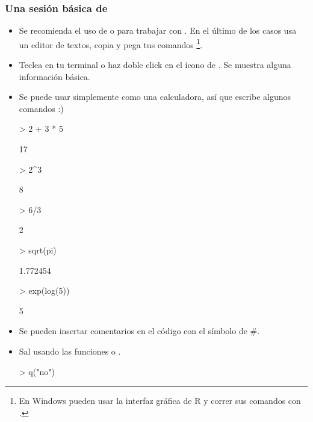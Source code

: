 \begin{frame}
  \frametitle{Una sesi\'on b\'asica de }
  \begin{itemize}
  \item Se recomienda el uso de   o  para trabajar con . En el \'ultimo de los casos usa un editor de textos, copia y pega tus comandos \footnote{En Windows pueden usar la interfaz gr\'afica de R y correr sus comandos con .}.
  \item Teclea  en tu terminal o haz doble click en el \'icono de . Se muestra alguna informaci\'on b\'asica.
  \item Se puede usar  simplemente como una calculadora, as\'i que escribe algunos comandos :)  
\begin{Schunk}
\begin{Sinput}
> 2 + 3 * 5
\end{Sinput}
\begin{Soutput}
[1] 17
\end{Soutput}
\begin{Sinput}
> 2^3
\end{Sinput}
\begin{Soutput}
[1] 8
\end{Soutput}
\begin{Sinput}
> 6/3
\end{Sinput}
\begin{Soutput}
[1] 2
\end{Soutput}
\begin{Sinput}
> sqrt(pi)
\end{Sinput}
\begin{Soutput}
[1] 1.772454
\end{Soutput}
\begin{Sinput}
> exp(log(5))
\end{Sinput}
\begin{Soutput}
[1] 5
\end{Soutput}
\end{Schunk}
  \item Se pueden insertar comentarios en el c\'odigo con el s\'imbolo de  \#.
  \item Sal usando las funciones  o .
\begin{Schunk}
\begin{Sinput}
> q("no")
\end{Sinput}
\end{Schunk}
  \end{itemize}
\end{frame}

